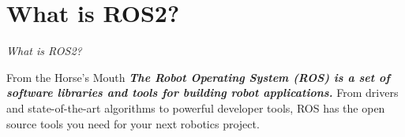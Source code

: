 \documentclass{beamer}
\begin{document}
\section{What is ROS2?}
\begin{frame}{\textit{What is ROS2?}}

    \begin{block}{From the Horse's Mouth}
        \textit{\textbf{The Robot Operating System (ROS) is a set of software libraries and tools for building robot applications.}} From drivers and state-of-the-art algorithms to powerful developer tools, ROS has the open source tools you need for your next robotics project.
    \end{block}


\end{frame}
\end{document}
